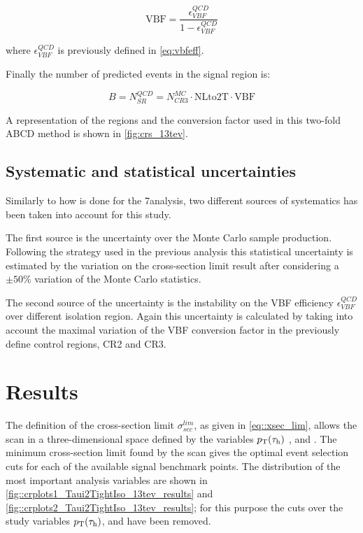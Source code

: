 \begin{equation}
\text{VBF} = \frac{\epsilon^{QCD}_{VBF}}{1 - \epsilon^{QCD}_{VBF}}
\end{equation}

where $\epsilon^{QCD}_{VBF}$ is previously defined in \autoref{eq:vbfeff}. 

Finally the number of predicted events in the signal region is:

\begin{equation}
B = N^{QCD}_{SR} = N^{MC}_{CR3}  \cdot \text{NLto2T} \cdot \text{VBF}
\label{eq::qcdbgpred_13tev}
\end{equation}

A representation of the regions and the conversion factor used in this two-fold ABCD method is shown in \autoref{fig:crs_13tev}.

\subsection{Systematic and statistical uncertainties}

Similarly to how is done for the 7\tev analysis, two different sources of systematics has been taken into account for this study. 

The first source is the uncertainty over the Monte Carlo sample production. Following the strategy used in the previous analysis this statistical uncertainty is estimated by the variation on the cross-section limit result after considering a $\pm 50\%$ variation of the Monte Carlo statistics.

The second source of the uncertainty is the instability on the VBF efficiency $\epsilon^{QCD}_{VBF}$ over different \hadtau isolation region. Again this uncertainty is calculated by taking into account the maximal variation of the VBF conversion factor in the previously define control regions, CR2 and CR3.

\section{Results}

The definition of the cross-section limit $\sigma^{lim}_{sec}$, as given in \autoref{eq::xsec_lim}, allows the scan in a three-dimensional space defined by the variables $p_{\text{T}}(\tau_{\text{h}})$ , \mjj and \met. The minimum cross-section limit found by the scan gives the optimal event selection cuts for each of the available signal benchmark points. The distribution of the most important analysis variables are shown in \autoref{fig::crplots1_Taui2TightIso_13tev_results} and \autoref{fig::crplots2_Taui2TightIso_13tev_results}; for this purpose the cuts over the study variables $p_{\text{T}}(\tau_{\text{h}})$, \mjj and \met have been removed. 

